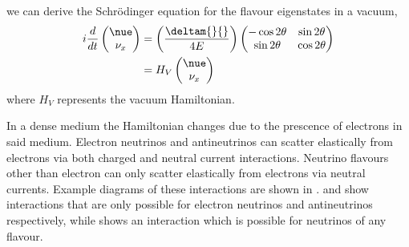 we can derive the Schr\"odinger equation for the flavour eigenstates in a vacuum,
\begin{align}
  i \frac{d}{dt}
  \begin{pmatrix}
    \nue \\ \nu_{x}
  \end{pmatrix}
  &=
  \left( \frac{\deltam{}{}}{4E} \right)
  \begin{pmatrix}
    -\cos 2\theta & \sin 2\theta \\
    \sin 2\theta & \cos 2\theta
  \end{pmatrix} \\
  &=
  H_{V}
  \begin{pmatrix} \nue \\ \nu_{x} \end{pmatrix}
\end{align}
where $H_{V}$ represents the vacuum Hamiltonian.

In a dense medium the Hamiltonian changes due to the prescence of electrons in said medium.
Electron neutrinos and antineutrinos can scatter elastically from electrons via both charged and neutral current interactions.
Neutrino flavours other than electron can only scatter elastically from electrons via neutral currents.
Example diagrams of these interactions are shown in .
 and  show interactions that are only possible for electron neutrinos and antineutrinos respectively, while  shows an interaction which is possible for neutrinos of any flavour.

